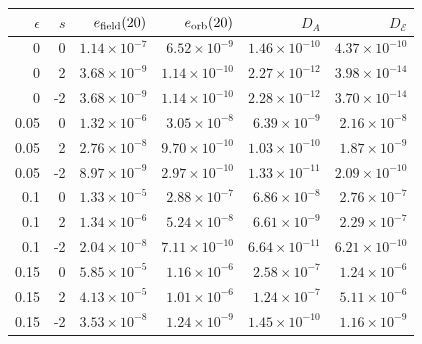 \begin{tabular}{rrrrrr}
\toprule
$\epsilon$ & $s$ & $e_{\rm field}(20)$ & $e_{\rm orb}(20)$ & $D_A$ & $D_{\mathcal E}$ \\
\midrule
0 & 0 & $1.14\times10^{-7}$ & $6.52\times10^{-9}$ & $1.46\times10^{-10}$ & $4.37\times10^{-10}$ \\
0 & 2 & $3.68\times10^{-9}$ & $1.14\times10^{-10}$ & $2.27\times10^{-12}$ & $3.98\times10^{-14}$ \\
0 & -2 & $3.68\times10^{-9}$ & $1.14\times10^{-10}$ & $2.28\times10^{-12}$ & $3.70\times10^{-14}$ \\
0.05 & 0 & $1.32\times10^{-6}$ & $3.05\times10^{-8}$ & $6.39\times10^{-9}$ & $2.16\times10^{-8}$ \\
0.05 & 2 & $2.76\times10^{-8}$ & $9.70\times10^{-10}$ & $1.03\times10^{-10}$ & $1.87\times10^{-9}$ \\
0.05 & -2 & $8.97\times10^{-9}$ & $2.97\times10^{-10}$ & $1.33\times10^{-11}$ & $2.09\times10^{-10}$ \\
0.1 & 0 & $1.33\times10^{-5}$ & $2.88\times10^{-7}$ & $6.86\times10^{-8}$ & $2.76\times10^{-7}$ \\
0.1 & 2 & $1.34\times10^{-6}$ & $5.24\times10^{-8}$ & $6.61\times10^{-9}$ & $2.29\times10^{-7}$ \\
0.1 & -2 & $2.04\times10^{-8}$ & $7.11\times10^{-10}$ & $6.64\times10^{-11}$ & $6.21\times10^{-10}$ \\
0.15 & 0 & $5.85\times10^{-5}$ & $1.16\times10^{-6}$ & $2.58\times10^{-7}$ & $1.24\times10^{-6}$ \\
0.15 & 2 & $4.13\times10^{-5}$ & $1.01\times10^{-6}$ & $1.24\times10^{-7}$ & $5.11\times10^{-6}$ \\
0.15 & -2 & $3.53\times10^{-8}$ & $1.24\times10^{-9}$ & $1.45\times10^{-10}$ & $1.16\times10^{-9}$ \\
\bottomrule
\end{tabular}
